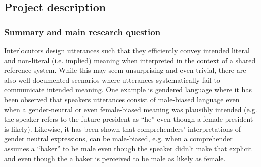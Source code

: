 \documentclass[11pt]{article}
\begin{document}
\subsection{Project description}



\subsubsection{Summary and main research question} %

Interlocutors design utterances such that they efficiently convey intended literal and non-literal (i.e. implied) meaning when interpreted in the context of a shared reference system.  While this may seem unsurprising and even trivial, there are also well-documented scenarios where utterances systematically fail to communicate intended meaning.  One example is gendered language where it has been observed that speakers utterances consist of male-biased language even when a gender-neutral or even female-biased  meaning was plausibly intended (e.g. the speaker refers to the future president as “he” even though a female president is likely).  Likewise, it has been shown that comprehenders’ interpretations of gender neutral expressions, can be male-biased, e.g. when a comprehender assumes a “baker” to be male even though the speaker didn’t make that explicit and even though the a baker is perceived to be male as likely as female.



\end{document}
